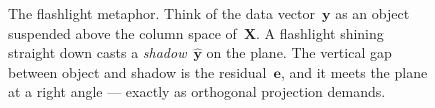 \begin{figure}[ht]
\caption{The flashlight metaphor.  Think of the data vector~$\bm{y}$ as an
object suspended above the column space of~$\bm{X}$.  A flashlight shining
straight down casts a \emph{shadow}~$\hat{\bm{y}}$ on the plane.  The
vertical gap between object and shadow is the residual~$\bm{e}$, and it
meets the plane at a right angle --- exactly as orthogonal projection
demands.}
\label{fig:flashlight}
\end{figure}


